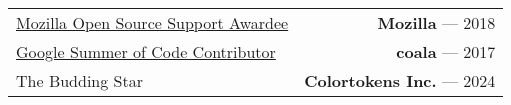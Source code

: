 \begin{tabularx}{\textwidth}{Xr}
\href{https://docs.naveenkumarsangi.me/moss.pdf}{Mozilla Open Source Support Awardee} & \textbf{Mozilla} --- 2018 \\
\href{https://docs.naveenkumarsangi.me/gsoc-mentee.pdf}{Google Summer of Code Contributor} & \textbf{coala} --- 2017 \\
The Budding Star & \textbf{Colortokens Inc.} --- 2024 \\
\end{tabularx}